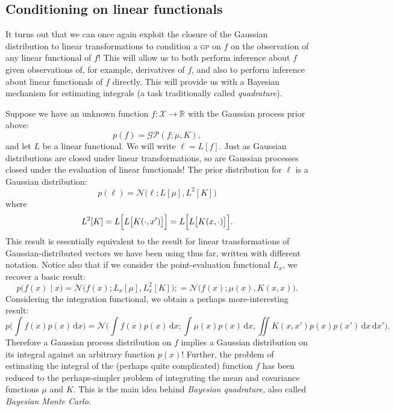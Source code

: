 \documentclass{article}
\newcommand{\acro}[1]{\textsc{\MakeLowercase{#1}}}
\newcommand{\given}{\mid}
\newcommand{\mc}[1]{\mathcal{#1}}
\newcommand{\intd}[1]{\,\mathrm{d}{#1}}
\newcommand{\R}{\mathbb{R}}
\begin{document}
\subsection*{Conditioning on linear functionals}

It turns out that we can once again exploit the closure of the
Gaussian distribution to linear transformations to condition a
\acro{GP} on $f$ on the observation of any linear functional of $f$!
This will allow us to both perform inference about $f$ given
observations of, for example, derivatives of $f$, and also to perform
inference about linear functionals of $f$ directly.  This will provide
us with a Bayesian mechanism for estimating integrals (a task
traditionally called \emph{quadrature}).

Suppose we have an unknown function $f\colon \mc{X} \to \R$ with the
Gaussian process prior above:
\begin{equation*}
  p(f) = \mc{GP}(f; \mu, K),
\end{equation*}
and let $L$ be a linear functional.  We will write $\ell = L[f]$.
Just as Gaussian distributions are closed under linear
transformations, so are Gaussian processes closed under the evaluation
of linear functionals!  The prior distribution for $\ell$ is a
Gaussian distribution:
\begin{equation*}
  p(\ell)
  =
  \mc{N}\bigl(\ell; L[\mu], L^2[K]\bigr)
\end{equation*}
where
\begin{equation*}
  L^2[K]
  =
  L\Bigl[L\bigl[K(\cdot, x')\bigr]\Bigr]
  =
  L\Bigl[L\bigl[K(x, \cdot)\bigr]\Bigr].
\end{equation*}
This result is essentially equivalent to the result for linear
transformations of Gaussian-distributed vectors we have been using
thus far, written with different notation.  Notice also that if we
consider the point-evaluation functional $L_x$, we recover a basic
result:
\begin{equation*}
  p\bigl(f(x) \given x\bigr)
  =
  \mc{N}\bigl(f(x); L_x[\mu], L_x^2[K]\bigr);
  =
  \mc{N}\bigl(f(x); \mu(x), K(x, x)\bigr).
\end{equation*}
Considering the integration functional, we obtain a perhaps
more-interesting result:
\begin{equation*}
  p\biggl(\int f(x) p(x) \intd{x} \biggr)
  =
  \mc{N}\biggl(\int f(x) p(x) \intd{x}; \int \mu(x) p(x) \intd{x}, \iint K(x, x') p(x) p(x') \intd{x} \intd{x'} \biggr).
\end{equation*}
Therefore a Gaussian process distribution on $f$ implies a Gaussian
distribution on its integral against an arbitrary function $p(x)$!
Further, the problem of estimating the integral of the (perhaps quite
complicated) function $f$ has been reduced to the perhaps-simpler
problem of integrating the mean and covariance functions $\mu$ and
$K$.  This is the main idea behind \emph{Bayesian quadrature,} also
called \emph{Bayesian Monte Carlo.}
\end{document}
